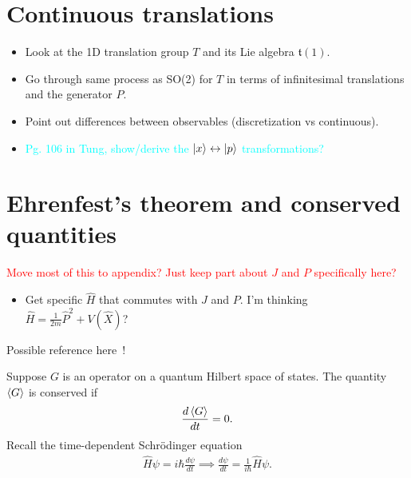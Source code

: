     \section{Continuous translations}
    \begin{itemize}
        \item Look at the 1D translation group $T$ and its Lie algebra $\mathfrak{t}(1)$.
        \item Go through same process as SO(2) for $T$ in terms of infinitesimal translations and the generator $P$.
        \item Point out differences between observables (discretization vs continuous).
        \item \textcolor{cyan}{Pg. 106 in Tung, show/derive the $\ket{x}\leftrightarrow\ket{p}$ transformations?}
    \end{itemize}

    \section{Ehrenfest's theorem and conserved quantities}
    \textcolor{red}{Move most of this to appendix? Just keep part about $J$ and $P$ specifically here?}

    \begin{itemize}
        \item Get specific $\hat{H}$ that commutes with $J$ and $P$. I'm thinking $\hat{H} = \frac{1}{2m}\hat{P}^2 + V(\hat{X})$?
    \end{itemize}

    Possible reference here~\cite{Hall2013}!
    
    Suppose $G$ is an operator on a quantum Hilbert space of states. The quantity $\braket{G}$ is conserved if
    \begin{align*}
        \frac{d\braket{G}}{dt} = 0.
    \end{align*}
    Recall the time-dependent Schr\"odinger equation
    \begin{align*}
        \hat{H}\psi = i\hbar\frac{d\psi}{dt} \implies \frac{d\psi}{dt} = \frac{1}{i\hbar}\hat{H}\psi.
    \end{align*}

